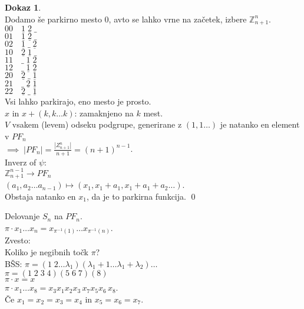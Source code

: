 \documentclass[a4paper, 12pt]{book}
\theoremstyle{definition}
\newtheorem{pro}[counter]{Dokaz}
\theoremstyle{remark}
\newcommand{\Z}{\mathbb{Z}}
\begin{document}
\begin{pro} \text{} \\
  Dodamo še parkirno mesto $0$, avto se lahko vrne na začetek, izbere $\Z_{n+1}^n$. \\
  $0 0 \quad \underline{1} \; \underline{2} \; \_$ \\
  $0 1 \quad \underline{1} \; \underline{2} \; \_$ \\
  $0 2 \quad \underline{1} \; \_ \; \underline{2}$ \\
  $1 0 \quad \underline{2} \; \underline{1} \; \_$ \\
  $1 1 \quad \_ \; \underline{1} \; \underline{2}$ \\
  $1 2 \quad \_ \; \underline{1} \; \underline{2}$ \\
  $2 0 \quad \underline{2} \; \_ \; \underline{1}$ \\
  $2 1 \quad \_ \; \underline{2} \; \underline{1}$ \\
  $2 2 \quad \underline{2} \; \_ \; \underline{1}$ \\
  Vsi lahko parkirajo, eno mesto je prosto. \\
  $x$ in $x + (k, k \dots k)$: zamaknjeno na $k$ mest. \\
  $V$ vsakem (levem) odseku podgrupe, generirane z $(1, 1 \dots )$ je natanko en element v $PF_n$ \\
  $\implies \; |PF_n| = \frac{\left|Z_{n+1}^n\right|}{n+1} = (n+1)^{n-1}$. \\
  Inverz of $\psi:$ \\
  $\Z_{n+1}^{n-1} \to PF_n$ \\
  $(a_1, a_2 \dots a_{n-1}) \mapsto (x_1, x_1+a_1, x_1+a_1+a_2 \dots)$. \\
  Obstaja natanko en $x_1$, da je to parkirna funkcija.
  \qed
\end{pro}
Delovanje $S_n$ na $PF_n$. \\
$\pi \cdot x_1 \dots x_n = x_{\pi^{-1}(1)} \dots x_{\pi^{-1}(n)}$. \\
Zvesto: \checkmark \\
Koliko je negibnih točk $\pi$? \\
BŠS: $\pi = (1 \; 2 \dots \lambda_1) (\lambda_1 + 1 \dots \lambda_1 + \lambda_2) \dots$ \\
$\pi = (1 \; 2 \; 3 \; 4) (5 \; 6 \; 7) (8)$ \\
$\pi \cdot x = x$ \\
$\pi \cdot x_1 \dots x_8 = x_3 x_1 x_2 x_3 \, x_7 x_5 x_6 \, x_8$. \\
Če $x_1 = x_2 = x_3 = x_4$ in $x_5 = x_6 = x_7$. \\
\end{document}
